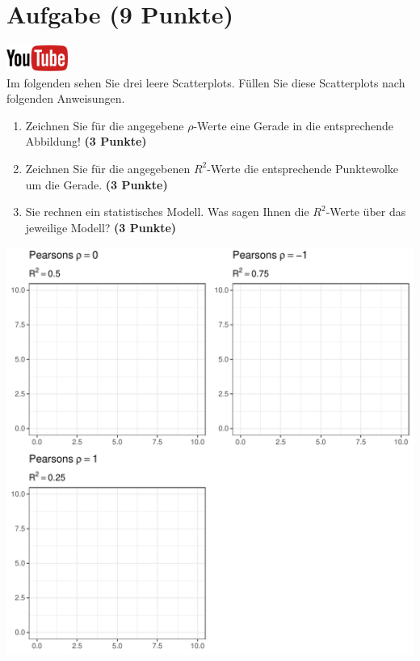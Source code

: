 \documentclass[a4paper, 10pt]{scrartcl}\usepackage[]{graphicx}\usepackage[]{xcolor}
\makeatletter
\def\maxwidth{ %
  \ifdim\Gin@nat@width>\linewidth
    \linewidth
  \else
    \Gin@nat@width
  \fi
}
\makeatother
\begin{document}
 
\clearpage

\section{Aufgabe \hfill (9 Punkte)}

\hfill\href{https://youtu.be/fB6nF4dxodA}{\includegraphics[width =
  2cm]{img/youtube}}\\[1Ex]


Im folgenden sehen Sie drei leere Scatterplots. F{\"u}llen Sie diese
Scatterplots nach folgenden Anweisungen.

\begin{enumerate}
\item Zeichnen Sie f{\"u}r die angegebene $\rho$-Werte eine Gerade in die
  entsprechende Abbildung! \textbf{(3 Punkte)}
\item Zeichnen Sie f{\"u}r die angegebenen $R^2$-Werte die entsprechende
  Punktewolke um die Gerade. \textbf{(3 Punkte)}
\item Sie rechnen ein statistisches Modell. Was sagen Ihnen die $R^2$-Werte
  {\"u}ber das jeweilige Modell? \textbf{(3 Punkte)}
\end{enumerate}




{\centering \includegraphics[width=\maxwidth]{img/correlation-01-1} 

}
\end{document}
